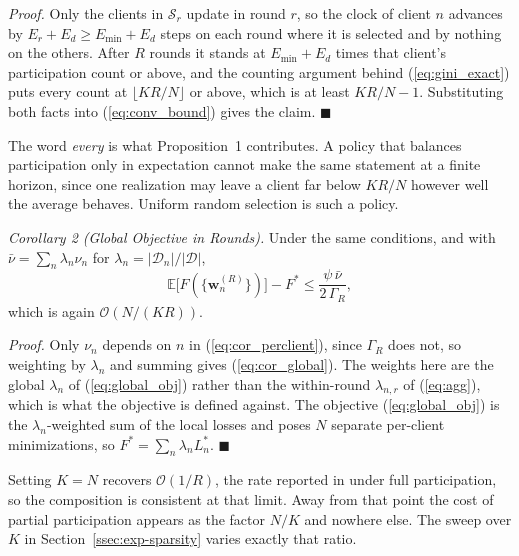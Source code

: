 \documentclass[journal]{IEEEtran}
\newcommand{\rev}[1]{#1}
\begin{document}
\rev{\textit{Proof.} Only the clients in $\mathcal{S}_r$ update in round $r$, so the clock of client $n$ advances by $E_r + E_d \ge E_{\min} + E_d$ steps on each round where it is selected and by nothing on the others. After $R$ rounds it stands at $E_{\min}+E_d$ times that client's participation count or above, and the counting argument behind (\ref{eq:gini_exact}) puts every count at $\lfloor KR/N \rfloor$ or above, which is at least $KR/N - 1$. Substituting both facts into (\ref{eq:conv_bound}) gives the claim. \hfill$\blacksquare$}

\rev{The word \emph{every} is what Proposition~1 contributes. A policy that balances participation only in expectation cannot make the same statement at a finite horizon, since one realization may leave a client far below $KR/N$ however well the average behaves. Uniform random selection is such a policy.}

\rev{\textit{Corollary 2 (Global Objective in Rounds).} Under the same conditions, and with $\bar{\nu} = \sum_{n} \lambda_n \nu_n$ for $\lambda_n = |\mathcal{D}_n| / |\mathcal{D}|$,}
\begin{equation}
\mathbb{E}\bigl[F(\{\bm{w}_n^{(R)}\})\bigr] - F^{*} \le \frac{\psi\, \bar{\nu}}{2\,\Gamma_R},
\label{eq:cor_global}
\end{equation}
\rev{which is again $\mathcal{O}(N/(KR))$.}

\rev{\textit{Proof.} Only $\nu_n$ depends on $n$ in (\ref{eq:cor_perclient}), since $\Gamma_R$ does not, so weighting by $\lambda_n$ and summing gives (\ref{eq:cor_global}). The weights here are the global $\lambda_n$ of (\ref{eq:global_obj}) rather than the within-round $\lambda_{n,r}$ of (\ref{eq:agg}), which is what the objective is defined against. The objective (\ref{eq:global_obj}) is the $\lambda_n$-weighted sum of the local losses and \cite{mu2024fedtskd} poses $N$ separate per-client minimizations, so $F^{*} = \sum_n \lambda_n L_n^{*}$. \hfill$\blacksquare$}

\rev{Setting $K = N$ recovers $\mathcal{O}(1/R)$, the rate reported in \cite{mu2024fedtskd} under full participation, so the composition is consistent at that limit. Away from that point the cost of partial participation appears as the factor $N/K$ and nowhere else. The sweep over $K$ in Section~\ref{ssec:exp-sparsity} varies exactly that ratio.}
\end{document}
